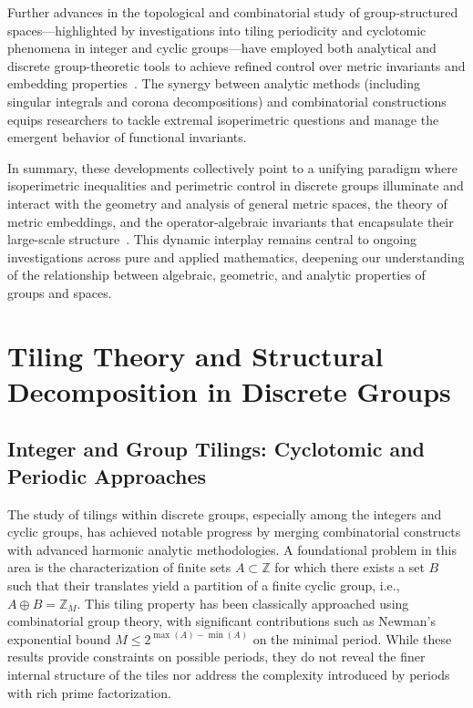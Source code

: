 \documentclass[sigconf]{acmart}
\begin{document}
Further advances in the topological and combinatorial study of group-structured spaces—highlighted by investigations into tiling periodicity and cyclotomic phenomena in integer and cyclic groups—have employed both analytical and discrete group-theoretic tools to achieve refined control over metric invariants and embedding properties~\cite{ref52}. The synergy between analytic methods (including singular integrals and corona decompositions) and combinatorial constructions equips researchers to tackle extremal isoperimetric questions and manage the emergent behavior of functional invariants.

In summary, these developments collectively point to a unifying paradigm where isoperimetric inequalities and perimetric control in discrete groups illuminate and interact with the geometry and analysis of general metric spaces, the theory of metric embeddings, and the operator-algebraic invariants that encapsulate their large-scale structure~\cite{ref51,ref52,ref108}. This dynamic interplay remains central to ongoing investigations across pure and applied mathematics, deepening our understanding of the relationship between algebraic, geometric, and analytic properties of groups and spaces.

\section{Tiling Theory and Structural Decomposition in Discrete Groups}

\subsection{Integer and Group Tilings: Cyclotomic and Periodic Approaches}

The study of tilings within discrete groups, especially among the integers and cyclic groups, has achieved notable progress by merging combinatorial constructs with advanced harmonic analytic methodologies. A foundational problem in this area is the characterization of finite sets \( A \subset \mathbb{Z} \) for which there exists a set \( B \) such that their translates yield a partition of a finite cyclic group, i.e., \( A \oplus B = \mathbb{Z}_M \). This tiling property has been classically approached using combinatorial group theory, with significant contributions such as Newman's exponential bound \( M \leq 2^{\max(A)-\min(A)} \) on the minimal period. While these results provide constraints on possible periods, they do not reveal the finer internal structure of the tiles nor address the complexity introduced by periods with rich prime factorization.
\end{document}
